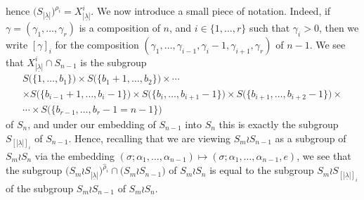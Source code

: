 \documentclass[10pt]{article}
\theoremstyle{definition}
\newcommand{\ul}[1]{\underline{#1}}
\begin{document}
hence $\bigl(S_{|\ul{\lambda}|}\bigr)^{\rho_i} = X^i_{|\ul{\lambda}|}$.
We now introduce a small piece of notation.
Indeed, if $\gamma = (\gamma_1,\ldots,\gamma_r)$ is a composition of $n$, and $i \in \{1,\ldots,r\}$ such that $\gamma_i > 0$, then we
write $[\gamma]_i$ for the composition $(\gamma_1,\ldots,\gamma_{i-1},\gamma_i -1, \gamma_{i+1},\gamma_r)$ of $n-1$.
We see that $X^i_{|\ul{\lambda}|}\cap S_{n-1}$ is the subgroup
\begin{multline*}
S\bigl(\{1,\ldots,b_1\}\bigr) \times S\bigl(\{b_1+1,\ldots,b_2\}\bigr) \times \cdots\\
\times S\bigl(\{b_{i-1}+1,\ldots,b_i-1\}\bigr)\times S\bigl(\{b_i,\ldots,b_{i+1}-1\}\bigr)\times S\bigl(\{b_{i+1},\ldots,b_{i+2}-1\}\bigr)
\times\\
\cdots \times S\bigl(\{b_{r-1},\ldots,b_r-1 =n-1\}\bigr)
\end{multline*}
of $S_n$, and under our embedding of $S_{n-1}$ into $S_n$
this is exactly the subgroup $S_{[|\ul{\lambda}|]_i}$ of $S_{n-1}$.
Hence, recalling that we are viewing $S_m \wr S_{n-1}$ as a subgroup
of $S_m \wr S_n$ via the embedding $(\sigma;\alpha_1,\ldots,\alpha_{n-1}) \longmapsto (\sigma;\alpha_1,\ldots,\alpha_{n-1},e)$, we see that
the subgroup $\bigl(S_m \wr S_{|\ul{\lambda}|}\bigr)^{\hat\rho_i}\cap\bigl(S_m \wr S_{n-1}\bigr)$ of $S_m \wr S_n$ is equal to the subgroup
$S_m \wr S_{[|\ul{\lambda}|]_i}$ of the subgroup $S_m \wr S_{n-1}$ of $S_m \wr S_n$.
\end{document}
